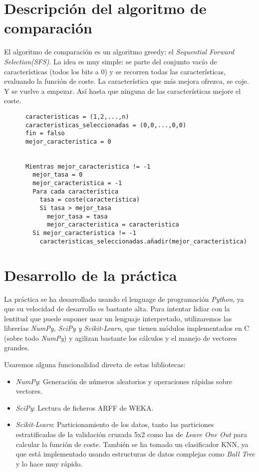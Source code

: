 \documentclass[a4paper, 11pt]{article}
\begin{document}
  \section{Descripción del algoritmo de comparación}
    El algoritmo de comparación es un algoritmo greedy: el \emph{Sequential Forward Selection(SFS)}. La idea es muy simple: se parte del conjunto vacío de características (todos los bits a 0) y se recorren todas las características, evaluando la función de coste. La característica que más mejora ofrezca, se coje. Y se vuelve a empezar. Así hasta que ninguna de las características mejore el coste.

    \begin{verbatim}
      caracteristicas = (1,2,...,n)
      caracteristicas_seleccionadas = (0,0,...,0,0)
      fin = falso
      mejor_caracteristica = 0


      Mientras mejor_caracteristica != -1
        mejor_tasa = 0
        mejor_caracteristica = -1
        Para cada característica
          tasa = coste(característica)
          Si tasa > mejor_tasa
            mejor_tasa = tasa
            mejor_caracteristica = caracteristica
        Si mejor_caracteristica != -1
          caracteristicas_seleccionadas.añadir(mejor_caracteristica)
    \end{verbatim}
  \section{Desarrollo de la práctica}
    La práctica se ha desarrollado usando el lenguage de programación \emph{Python}, ya que su velocidad de desarrollo es bastante alta. Para intentar lidiar con la lentitud que puede suponer usar un lenguaje interpretado, utilizaremos las librerías \emph{NumPy, SciPy y Scikit-Learn}, que tienen módulos implementados en C (sobre todo \emph{NumPy}) y agilizan bastante los cálculos y el manejo de vectores grandes.

    Usaremos alguna funcionalidad directa de estas bibliotecas:
    \begin{itemize}
      \item \emph{NumPy}: Generación de números aleatorios y operaciones rápidas sobre vectores.
      \item \emph{SciPy}: Lectura de ficheros ARFF de WEKA.
      \item \emph{Scikit-Learn}: Particionamiento de los datos, tanto las particiones estratificadas de la validación cruzada 5x2 como las de \emph{Leave One Out} para calcular la función de coste. También se ha tomado un clasificador KNN, ya que está implementado usando estructuras de datos complejas como \emph{Ball Tree} y lo hace muy rápido.
    \end{itemize}
\end{document}

